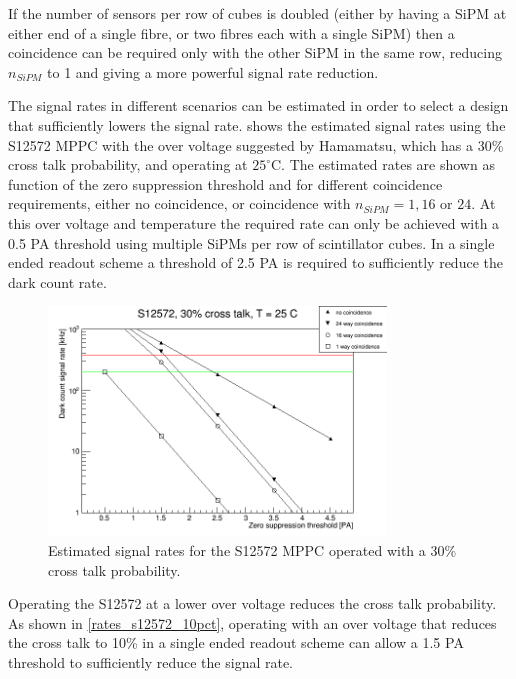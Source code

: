 \documentclass[a4paper]{article}
\begin{document}
If the number of sensors per row of cubes is doubled (either by having a SiPM at either end of a single fibre, or two fibres each with a single SiPM) then a coincidence can be required only with the other SiPM in the same row, reducing $n_{SiPM}$ to 1 and giving a more powerful signal rate reduction.

The signal rates in different scenarios can be estimated in order to select a design that sufficiently lowers the signal rate.
 shows the estimated signal rates using the S12572 MPPC with the over voltage suggested by Hamamatsu, which has a 30\% cross talk probability, and operating at $25^{\circ}$C.
The estimated rates are shown as function of the zero suppression threshold and for different coincidence requirements, either no coincidence, or coincidence with $n_{SiPM} = 1, 16\mbox{ or }24.$
At this over voltage and temperature the required rate can only be achieved with a 0.5 PA threshold using multiple SiPMs per row of scintillator cubes.
In a single ended readout scheme a threshold of 2.5 PA is required to sufficiently reduce the dark count rate.

\begin{figure}[hp]
    \begin{center}
        \includegraphics[width=0.8\textwidth]{imgs/g_s12572_30pct}
        \caption{Estimated signal rates for the S12572 MPPC operated with a 30\% cross talk probability.}
        \label{rates_s12572_30pct}
    \end{center}
\end{figure}

Operating the S12572 at a lower over voltage reduces the cross talk probability.
As shown in \cref{rates_s12572_10pct}, operating with an over voltage that reduces the cross talk to 10\% in a single ended readout scheme can allow a 1.5 PA threshold to sufficiently reduce the signal rate.
\end{document}
